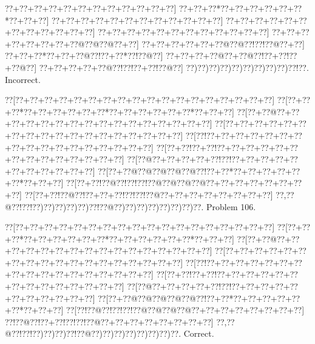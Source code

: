 \documentclass[a5paper]{article}
\begin{document}
\begin{center}
{\goo
\0??+\0??+\0??+\0??+\0??+\0??+\0??+\0??+\0??+\0??+\0??+\0??]
\0??+\0??+\0??*\0??+\0??+\0??+\0??+\0??+\0??*\0??+\0??+\0??]
\0??+\0??+\0??+\0??+\0??+\0??+\0??+\0??+\0??+\0??+\0??+\0??]
\0??+\0??+\0??+\0??+\0??+\0??+\0??+\0??+\0??+\0??+\0??+\0??]
\0??+\0??+\0??+\0??+\0??+\0??+\0??+\0??+\0??+\0??+\0??+\0??]
\0??+\0??+\0??+\0??+\0??+\0??+\0??+\0??@\0??@\0??@\0??+\0??]
\0??+\0??+\0??+\0??+\0??+\0??@\0??@\0??!\0??!\0??@\0??+\0??]
\0??+\0??+\0??*\0??+\0??+\0??@\0??!\0??+\0??*\0??!\0??@\0??]
\0??+\0??+\0??+\0??@\0??+\0??@\0??!\0??+\0??!\0??+\0??@\0??]
\0??+\0??+\0??+\0??+\0??@\0??!\0??!\0??+\0??!\0??@\0??]
\0??)\0??)\0??)\0??)\0??)\0??)\0??)\0??)\0??)\0??!\0??.
}
Incorrect. 

\end{center}
\newpage
\begin{center}
{\goo
\0??[\0??+\0??+\0??+\0??+\0??+\0??+\0??+\0??+\0??+\0??+\0??+\0??+\0??+\0??+\0??+\0??+\0??+\0??]
\0??[\0??+\0??+\0??*\0??+\0??+\0??+\0??+\0??+\0??*\0??+\0??+\0??+\0??+\0??+\0??*\0??+\0??+\0??]
\0??[\0??+\0??@\0??+\0??+\0??+\0??+\0??+\0??+\0??+\0??+\0??+\0??+\0??+\0??+\0??+\0??+\0??+\0??]
\0??[\0??+\0??+\0??+\0??+\0??+\0??+\0??+\0??+\0??+\0??+\0??+\0??+\0??+\0??+\0??+\0??+\0??+\0??]
\0??[\0??!\0??+\0??+\0??+\0??+\0??+\0??+\0??+\0??+\0??+\0??+\0??+\0??+\0??+\0??+\0??+\0??+\0??]
\0??[\0??+\0??!\0??+\0??!\0??+\0??+\0??+\0??+\0??+\0??+\0??+\0??+\0??+\0??+\0??+\0??+\0??+\0??]
\0??[\0??@\0??+\0??+\0??+\0??+\0??!\0??!\0??+\0??+\0??+\0??+\0??+\0??+\0??+\0??+\0??+\0??+\0??]
\0??[\0??+\0??@\0??@\0??@\0??@\0??@\0??!\0??+\0??*\0??+\0??+\0??+\0??+\0??+\0??*\0??+\0??+\0??]
\0??[\0??+\0??!\0??@\0??!\0??!\0??!\0??@\0??@\0??@\0??@\0??+\0??+\0??+\0??+\0??+\0??+\0??+\0??]
\0??[\0??+\0??!\0??@\0??!\0??+\0??+\0??!\0??!\0??!\0??@\0??+\0??+\0??+\0??+\0??+\0??+\0??+\0??]
\0??,\0??@\0??!\0??!\0??)\0??)\0??)\0??)\0??)\0??!\0??@\0??)\0??)\0??)\0??)\0??)\0??)\0??)\0??.
}
Problem 106.

\end{center}
\begin{center}
{\goo
\0??[\0??+\0??+\0??+\0??+\0??+\0??+\0??+\0??+\0??+\0??+\0??+\0??+\0??+\0??+\0??+\0??+\0??+\0??]
\0??[\0??+\0??+\0??*\0??+\0??+\0??+\0??+\0??+\0??*\0??+\0??+\0??+\0??+\0??+\0??*\0??+\0??+\0??]
\0??[\0??+\0??@\0??+\0??+\0??+\0??+\0??+\0??+\0??+\0??+\0??+\0??+\0??+\0??+\0??+\0??+\0??+\0??]
\0??[\0??+\0??+\0??+\0??+\0??+\0??+\0??+\0??+\0??+\0??+\0??+\0??+\0??+\0??+\0??+\0??+\0??+\0??]
\0??[\0??!\0??+\0??+\0??+\0??+\0??+\0??+\0??+\0??+\0??+\0??+\0??+\0??+\0??+\0??+\0??+\0??+\0??]
\0??[\0??+\0??!\0??+\0??!\0??+\0??+\0??+\0??+\0??+\0??+\0??+\0??+\0??+\0??+\0??+\0??+\0??+\0??]
\0??[\0??@\0??+\0??+\0??+\0??+\0??!\0??!\0??+\0??+\0??+\0??+\0??+\0??+\0??+\0??+\0??+\0??+\0??]
\0??[\0??+\0??@\0??@\0??@\0??@\0??@\0??!\0??+\0??*\0??+\0??+\0??+\0??+\0??+\0??*\0??+\0??+\0??]
\0??[\0??!\0??@\0??!\0??!\0??!\0??@\0??@\0??@\0??@\0??+\0??+\0??+\0??+\0??+\0??+\0??+\0??]
\0??!\0??@\0??!\0??+\0??!\0??!\0??!\0??@\0??+\0??+\0??+\0??+\0??+\0??+\0??+\0??]
\0??,\0??@\0??!\0??!\0??)\0??)\0??)\0??!\0??@\0??)\0??)\0??)\0??)\0??)\0??)\0??)\0??.
}
Correct. 

\end{center}
\end{document}
